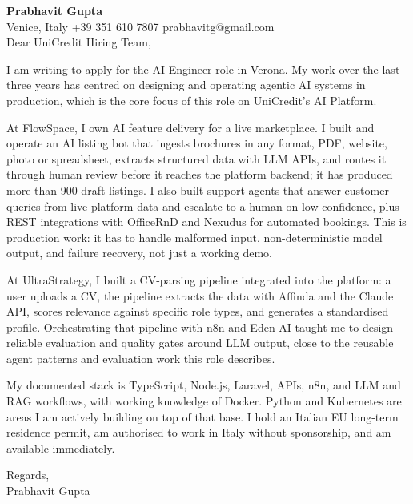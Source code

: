 \documentclass[a4paper,10.5pt]{article}
\begin{document}
\textbf{Prabhavit Gupta}\\
Venice, Italy \textbar{} +39 351 610 7807 \textbar{} prabhavitg@gmail.com\\[10pt]
Dear UniCredit Hiring Team,

I am writing to apply for the AI Engineer role in Verona. My work over the last three years has centred on designing and operating agentic AI systems in production, which is the core focus of this role on UniCredit's AI Platform.

At FlowSpace, I own AI feature delivery for a live marketplace. I built and operate an AI listing bot that ingests brochures in any format, PDF, website, photo or spreadsheet, extracts structured data with LLM APIs, and routes it through human review before it reaches the platform backend; it has produced more than 900 draft listings. I also built support agents that answer customer queries from live platform data and escalate to a human on low confidence, plus REST integrations with OfficeRnD and Nexudus for automated bookings. This is production work: it has to handle malformed input, non-deterministic model output, and failure recovery, not just a working demo.

At UltraStrategy, I built a CV-parsing pipeline integrated into the platform: a user uploads a CV, the pipeline extracts the data with Affinda and the Claude API, scores relevance against specific role types, and generates a standardised profile. Orchestrating that pipeline with n8n and Eden AI taught me to design reliable evaluation and quality gates around LLM output, close to the reusable agent patterns and evaluation work this role describes.

My documented stack is TypeScript, Node.js, Laravel, APIs, n8n, and LLM and RAG workflows, with working knowledge of Docker. Python and Kubernetes are areas I am actively building on top of that base. I hold an Italian EU long-term residence permit, am authorised to work in Italy without sponsorship, and am available immediately.

Regards,\\
Prabhavit Gupta
\end{document}
